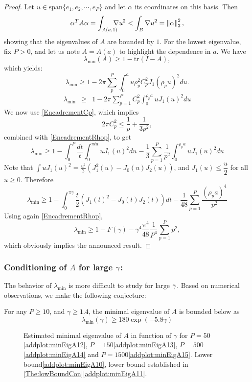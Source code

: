 \documentclass[11pt,a4paper]{article}
\begin{document}
\begin{proof}
	Let $u \in \text{span}\{e_1,e_2,\cdots,e_P\}$ and let $\alpha$ its coordinates on this basis. Then 
	\[\alpha^T A \alpha = \int_{\mathcal{A}(a,1)} \!\!\!\!\! \nabla{u}^2 < \int_{B} \nabla{u}^2 = \left\|\alpha\right\|_2^2,\]
	showing that the eigenvalues of $A$ are bounded by $1$. For the lowest eigenvalue, fix $P>0$, and let us note $A = A(a)$ to highlight the dependence in $a$. We have
	\[\lambda_{\min}(A) \geq 1 - \text{tr}(I - A),\]
	which yields:
	\[\lambda_{\min} \geq 1 - 2\pi \sum_p^P \int_{0}^a u \rho_p^2 C_p^2 J_1(\rho_p u)^2 du.\]	
	\begin{eqnarray*}
		\lambda_{\min} &\geq& 1 - 2\pi \sum_{p=1}^{P}C_p^2\int_{0}^{\rho_p a} u J_1(u)^2 du
	\end{eqnarray*}
	We now use \ref{EncadrementCp}, which implies
	\[2\pi C_p^2 \leq \dfrac{1}{p} + \dfrac{1}{3p^2},\]
	combined with \ref{EncadrementRhop}, to get
	\[\lambda_{\min} \geq 1 - \int_{0}^{P} \frac{dt}{t} \int_{0}^{\pi t a} u J_1(u)^2du \hspace{1pt} - \frac{1}{3}\sum_{p=1}^P \frac{1}{p^2} \int_{0}^{\rho_p a} u J_1(u)^2du\]
	Note that $\int u J_1(u)^2 = \frac{u^2}{2} \left(J_1^2(u) - J_0(u)J_2(u)\right)$, and $J_1(u) \leq \dfrac{u}{2}$ for all $u \geq 0$. Therefore
	\[\lambda_{\min} \geq 1 - \int_{0}^{\pi\gamma} \dfrac{t}{2} \left(J_1(t)^2 - J_0(t)J_2(t)\right)dt - \frac{1}{48} \sum_{p=1}^P \frac{(\rho_p a)^4}{p^2}\]
	Using again \ref{EncadrementRhop},
	\[\lambda_{\min} \geq 1 - F(\gamma) - \gamma^4\frac{\pi^4}{48} \frac{1}{P^4} \sum_{p=1}^P p^2,\]
	which obviously implies the announced result.
\end{proof}
\subsubsection*{Conditioning of $A$ for large $\gamma$:}

The behavior of $\lambda_{\min}$ is more difficult to study for large $\gamma$. Based on numerical observations, we make the following conjecture:

	\begin{Conj}
		For any $P \geq 10$, and $\gamma \geq 1.4$, the minimal eigenvalue of $A$ is bounded below as
		\[\lambda_{\min}(\gamma) \geq 180 \exp(-5.8\gamma)\]
	\end{Conj}
	\begin{figure}[H]
		\centering
		
		\captionsetup{width=0.888\textwidth}
		\caption{Estimated minimal eigenvalue of $A$ in function of $\gamma$ for $P=50$\ref{addplot:minEigA12}, $P=150$\ref{addplot:minEigA13}, $P=500$\ref{addplot:minEigA14} and $P=1500$\ref{addplot:minEigA15}. Lower bound\ref{addplot:minEigA10}, lower bound established in \autoref{The:lowBoundCon}\ref{addplot:minEigA11}.}
	\end{figure}
\end{document}
